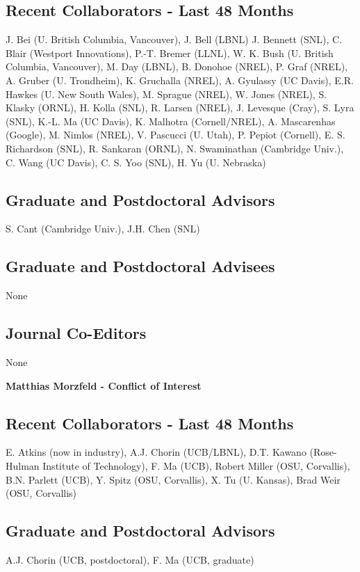 \documentclass[11pt]{article}
\begin{document}
\subsection*{Recent Collaborators - Last 48 Months}
J. Bei (U. British Columbia, Vancouver), J. Bell (LBNL) J. Bennett (SNL), C. Blair (Westport Innovations), P.-T. Bremer (LLNL), W. K. Bush (U. British Columbia, Vancouver), M. Day (LBNL), B. Donohoe (NREL), P. Graf (NREL), A. Gruber (U. Trondheim), K. Gruchalla (NREL), A. Gyulassy (UC Davis), E.R. Hawkes (U. New South Wales), M. Sprague (NREL), W. Jones (NREL), 
S. Klasky (ORNL), H. Kolla (SNL), R. Larsen (NREL), J. Levesque (Cray), S. Lyra (SNL), K.-L. Ma (UC Davis), K. Malhotra (Cornell/NREL), A. Mascarenhas (Google), M. Nimlos (NREL), V. Pascucci (U. Utah), P. Pepiot (Cornell), E. S. Richardson (SNL), R. Sankaran (ORNL), N. Swaminathan (Cambridge Univ.), C. Wang (UC Davis), C. S. Yoo (SNL), H. Yu (U. Nebraska)

\subsection*{Graduate and Postdoctoral Advisors}
S. Cant (Cambridge Univ.), J.H. Chen (SNL)

\subsection*{Graduate and Postdoctoral Advisees} 
None

\subsection*{Journal Co-Editors} None




\newpage
\begin{center}
{\Large{\textbf{Matthias Morzfeld - Conflict of Interest}}}
\end{center}

\subsection*{Recent Collaborators - Last 48 Months}
E. Atkins (now in industry), A.J. Chorin (UCB/LBNL), D.T. Kawano (Rose-Hulman Institute of Technology), F. Ma (UCB), Robert Miller (OSU, Corvallis), B.N. Parlett (UCB), Y. Spitz (OSU, Corvallis), X. Tu (U. Kansas), Brad Weir (OSU, Corvallis)

\subsection*{Graduate and Postdoctoral Advisors}
A.J. Chorin (UCB, postdoctoral), F. Ma (UCB, graduate)
\end{document}
